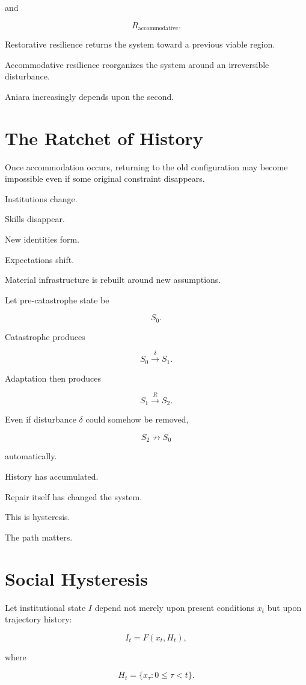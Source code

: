 \documentclass[11pt,oneside]{book}
\theoremstyle{definition}
\theoremstyle{remark}
\begin{document}
and

\[
R_{\mathrm{accommodative}}.
\]

Restorative resilience returns the system toward a previous viable region.

Accommodative resilience reorganizes the system around an irreversible disturbance.

Aniara increasingly depends upon the second.

\section{The Ratchet of History}

Once accommodation occurs, returning to the old configuration may become impossible even if some original constraint disappears.

Institutions change.

Skills disappear.

New identities form.

Expectations shift.

Material infrastructure is rebuilt around new assumptions.

Let pre-catastrophe state be

\[
S_0.
\]

Catastrophe produces

\[
S_0\xrightarrow{\delta}S_1.
\]

Adaptation then produces

\[
S_1\xrightarrow{R}S_2.
\]

Even if disturbance \(\delta\) could somehow be removed,

\[
S_2
\not\rightarrow
S_0
\]

automatically.

History has accumulated.

Repair itself has changed the system.

This is hysteresis.

The path matters.

\section{Social Hysteresis}

Let institutional state \(I\) depend not merely upon present conditions \(x_t\) but upon trajectory history:

\[
I_t
=
F(x_t,H_t),
\]

where

\[
H_t
=
\{x_\tau:0\leq\tau<t\}.
\]
\end{document}
